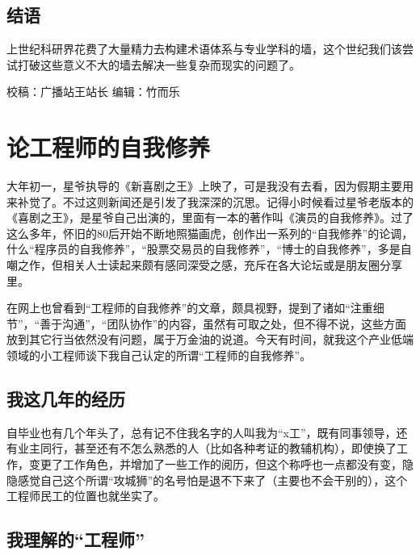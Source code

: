 \documentclass[
]{book}
\begin{document}
\hypertarget{ux7ed3ux8bed-18}{%
\subsection{结语}\label{ux7ed3ux8bed-18}}

上世纪科研界花费了大量精力去构建术语体系与专业学科的墙，这个世纪我们该尝试打破这些意义不大的墙去解决一些复杂而现实的问题了。

校稿：广播站王站长
编辑：竹而乐

\hypertarget{ux8bbaux5de5ux7a0bux5e08ux7684ux81eaux6211ux4feeux517b}{%
\section{论工程师的自我修养}\label{ux8bbaux5de5ux7a0bux5e08ux7684ux81eaux6211ux4feeux517b}}

大年初一，星爷执导的《新喜剧之王》上映了，可是我没有去看，因为假期主要用来补觉了。不过这则新闻还是引发了我深深的沉思。记得小时候看过星爷老版本的《喜剧之王》，是星爷自己出演的，里面有一本的著作叫《演员的自我修养》。过了这么多年，怀旧的80后开始不断地照猫画虎，创作出一系列的``自我修养''的论调，什么``程序员的自我修养''，``股票交易员的自我修养''，``博士的自我修养''，多是自嘲之作，但相关人士读起来颇有感同深受之感，充斥在各大论坛或是朋友圈分享里。

在网上也曾看到``工程师的自我修养''的文章，颇具视野，提到了诸如``注重细节''，``善于沟通''，``团队协作''的内容，虽然有可取之处，但不得不说，这些方面放到其它行当依然没有问题，属于万金油的说道。今天有时间，就我这个产业低端领域的小工程师谈下我自己认定的所谓``工程师的自我修养''。

\hypertarget{ux6211ux8fd9ux51e0ux5e74ux7684ux7ecfux5386}{%
\subsection{我这几年的经历}\label{ux6211ux8fd9ux51e0ux5e74ux7684ux7ecfux5386}}

自毕业也有几个年头了，总有记不住我名字的人叫我为``x工''，既有同事领导，还有业主同行，甚至还有不怎么熟悉的人（比如各种考证的教辅机构），即使换了工作，变更了工作角色，并增加了一些工作的阅历，但这个称呼也一点都没有变，隐隐感觉自己这个所谓``攻城狮''的名号怕是退不下来了（主要也不会干别的），这个工程师民工的位置也就坐实了。

\hypertarget{ux6211ux7406ux89e3ux7684ux5de5ux7a0bux5e08}{%
\subsection{我理解的``工程师''}\label{ux6211ux7406ux89e3ux7684ux5de5ux7a0bux5e08}}
\end{document}
